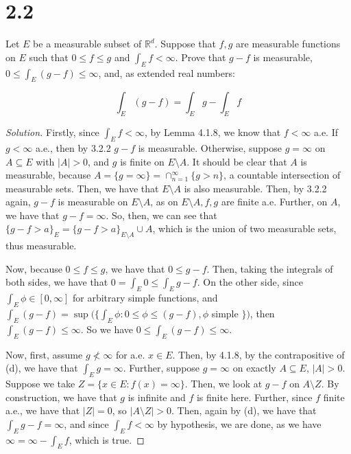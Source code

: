 \documentclass[10pt]{article}
\newenvironment{problem}[2][Problem]{\begin{trivlist}
\item[\hskip \labelsep {\bfseries #1}\hskip \labelsep {\bfseries #2.}]}{\end{trivlist}}
\begin{document}
\section*{2.2}

\begin{problem}{4.1.12}
Let $E$ be a measurable subset of $\mathbb{R}^d$. Suppose that $f,g$ are measurable functions on $E$ such that $0 \leq f \leq g$ and $\int_E f < \infty$. Prove that $g-f$ is measurable, $0 \leq \int_E (g-f) \leq \infty$, and, as extended real numbers:

$$\int_E (g-f) = \int_E g - \int_E f$$
\end{problem}
\begin{proof}[Solution]

Firstly, since $\int_E f < \infty$, by Lemma 4.1.8, we know that $f < \infty$ a.e. If $g < \infty$ a.e., then by 3.2.2 $g - f$ is measurable. Otherwise, suppose $g = \infty$ on $A \subseteq E$ with $|A| > 0$, and $g$ is finite on $E \setminus A$. It should be clear that $A$ is measurable, because $A = \{ g = \infty \} = \cap_{n=1}^\infty \{ g > n \}$, a countable intersection of measurable sets. Then, we have that $E \setminus A$ is also measurable. Then, by 3.2.2 again, $g - f$ is measurable on $E \setminus A$, as on $E \setminus A, f,g$ are finite a.e. Further, on $A$, we have that $g - f = \infty$. So, then, we can see that $\{ g - f > a \}_E = \{ g - f > a \}_{E \setminus A} \cup A$, which is the union of two measurable sets, thus measurable.

Now, because $0 \leq f \leq g$, we have that $0 \leq g - f$. Then, taking the integrals of both sides, we have that $0 = \int_E 0 \leq \int_E g - f$. On the other side, since $\int_E \phi \in [0,\infty]$ for arbitrary simple functions, and $\int_E (g-f) = \sup(\{ \int_E \phi : 0 \leq \phi \leq (g-f), \phi$ simple $\})$, then $\int_E (g-f) \leq \infty$. So we have $0 \leq \int_E (g-f) \leq \infty$.

Now, first, assume $g \not < \infty$ for a.e. $x \in E$. Then, by 4.1.8, by the contrapositive of (d), we have that $\int_E g = \infty$. Further, suppose $g  = \infty$ on exactly $A \subseteq E$, $|A| > 0$. Suppose we take $Z = \{ x \in E : f(x) = \infty \}$. Then, we look at $g - f$ on $A \setminus Z$. By construction, we have that $g$ is infinite and $f$ is finite here. Further, since $f$ finite a.e., we have that $|Z| = 0$, so $|A \setminus Z| > 0$. Then, again by (d), we have that $\int_E g - f = \infty$, and since $\int_E f < \infty$ by hypothesis, we are done, as we have $\infty = \infty - \int_E f$, which is true.


\end{proof}
\end{document}
